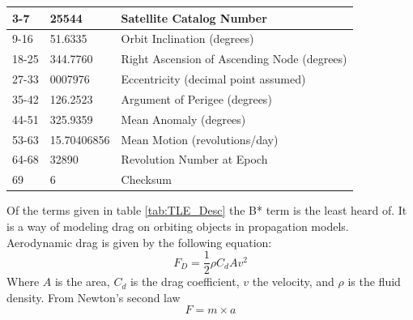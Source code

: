 \documentclass[12pt]{report}
\begin{document}
\begin{table}[h!]
{\begin{tabular}{|l|l|l|}
				3-7                                     & 25544                                   & Satellite Catalog Number                                                        \\ \hline
				9-16                                    & 51.6335                                 & Orbit Inclination (degrees)                                                     \\ \hline
				18-25                                   & 344.7760                                & Right Ascension of Ascending Node (degrees)                                     \\ \hline
				27-33                                   & 0007976                                 & Eccentricity (decimal point assumed)                                            \\ \hline
				35-42                                   & 126.2523                                & Argument of Perigee (degrees)                                                   \\ \hline
				44-51                                   & 325.9359                                & Mean Anomaly (degrees)                                                          \\ \hline
				53-63                                   & 15.70406856                             & Mean Motion (revolutions/day)                                                   \\ \hline
				64-68                                   & 32890                                   & Revolution Number at Epoch                                                      \\ \hline
				69                                      & 6                                       & Checksum                                                                        \\ \hline
			\end{tabular}%
		}
	\end{table}
	Of the terms given in table \ref{tab:TLE_Desc} the B* term is the least heard of. It is a way of modeling drag on orbiting objects in propagation models.  
	Aerodynamic drag is given by the following equation:
	\begin{equation}
	F_D = \frac{1}{2}\rho C_d A v^2
	\end{equation}
	Where $A$ is the area, $C_d$ is the drag coefficient, $v$ the velocity, and $\rho$ is the fluid density. From Newton's second law
	\begin{equation}
	F = m\times a
	\end{equation}
\end{document}
